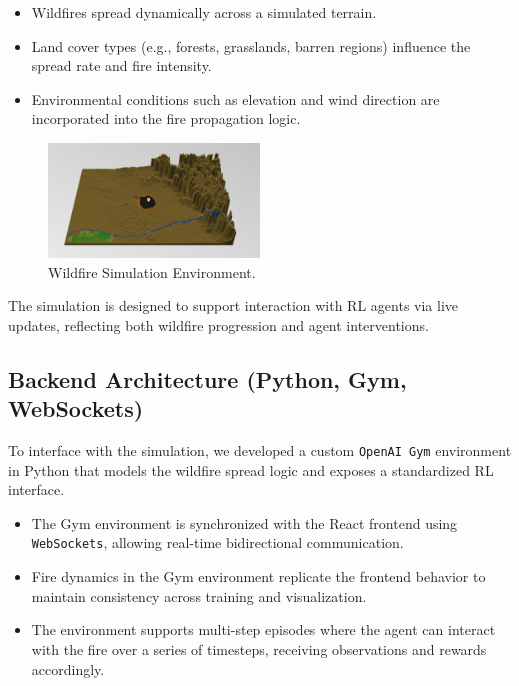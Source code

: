 \documentclass[conference]{IEEEtran}
\begin{document}
\begin{itemize}
    \item Wildfires spread dynamically across a simulated terrain.
    \item Land cover types (e.g., forests, grasslands, barren regions) influence the spread rate and fire intensity.
    \item Environmental conditions such as elevation and wind direction are incorporated into the fire propagation logic.
\end{itemize}

\begin{figure}[h!]
    \centering
    \includegraphics[width=0.5\textwidth]{sim.png}
    \caption{Wildfire Simulation Environment.}

\end{figure}

\noindent
The simulation is designed to support interaction with RL agents via live updates, reflecting both wildfire progression and agent interventions.

\subsection{Backend Architecture (Python, Gym, WebSockets)}
To interface with the simulation, we developed a custom \texttt{OpenAI Gym} environment in Python that models the wildfire spread logic and exposes a standardized RL interface.

\begin{itemize}
    \item The Gym environment is synchronized with the React frontend using \texttt{WebSockets}, allowing real-time bidirectional communication.
    \item Fire dynamics in the Gym environment replicate the frontend behavior to maintain consistency across training and visualization.
    \item The environment supports multi-step episodes where the agent can interact with the fire over a series of timesteps, receiving observations and rewards accordingly.
\end{itemize}
\end{document}
